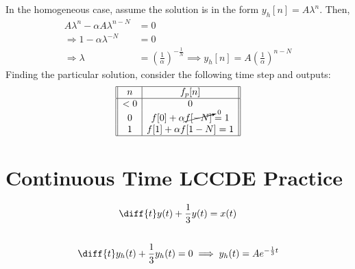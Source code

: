 \documentclass{article}
\begin{document}
\subsection{}

In the homogeneous case, assume the solution is in the form \(y_h[n] = A \lambda^n\).
Then,
\begin{align}
    A\lambda^n - \alpha A \lambda^{n - N} &= 0 \\
    \Rightarrow 1 - \alpha \lambda^{-N} &= 0 \\
    \Rightarrow \lambda &= \left(\frac{1}{\alpha}\right)^{-\frac{1}{N}} \implies y_h[n] = A \left(\frac{1}{\alpha}\right)^{n - N}
\end{align}
Finding the particular solution, consider the following time step and outputs:
\begin{equation}
    \begin{array}[]{||c|c||}
        \hline
        n & f_p[n] \\
        \hline
        <0 & 0 \\
        0 & f[0] + \alpha \cancelto{0}{f[-N]} = 1 \\
        1 & f[1] + \alpha f[1 - N] = 1 \\
        \hline
    \end{array}
\end{equation}

\subsection{}

\subsection{}

\section{Continuous Time LCCDE Practice}

\begin{equation}
    \diff{t} y(t) + \frac{1}{3} y(t) = x(t)
\end{equation}

\subsection{}

\begin{equation}
    \diff{t} y_h(t) + \frac{1}{3} y_h(t) = 0 \implies y_h(t) = A e^{-\frac{1}{3} t}
\end{equation}
\end{document}
